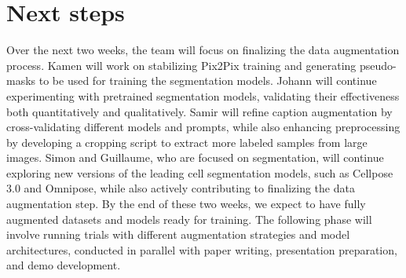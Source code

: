 \documentclass[]{article}
\begin{document}
\section{Next steps}
Over the next two weeks, the team will focus on finalizing the data augmentation process. Kamen will work on stabilizing Pix2Pix training and generating pseudo-masks to be used for training the segmentation models. Johann will continue experimenting with pretrained segmentation models, validating their effectiveness both quantitatively and qualitatively. Samir will refine caption augmentation by cross-validating different models and prompts, while also enhancing preprocessing by developing a cropping script to extract more labeled samples from large images. Simon and Guillaume, who are focused on segmentation, will continue exploring new versions of the leading cell segmentation models, such as Cellpose 3.0 and Omnipose, while also actively contributing to finalizing the data augmentation step. By the end of these two weeks, we expect to have fully augmented datasets and models ready for training. The following phase will involve running trials with different augmentation strategies and model architectures, conducted in parallel with paper writing, presentation preparation, and demo development.
\end{document}
